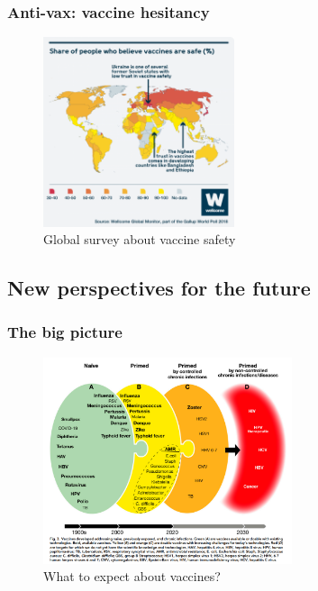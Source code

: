 \begin{frame}
    \frametitle{Anti-vax: vaccine hesitancy}
    \begin{figure}
        \centering
        \includegraphics[width=0.5\textwidth]{imgs/VaccineHesitancy.png}
        \caption{Global survey about vaccine safety \autocite{SurveyRevealsEuropean}}
        \label{fig:responses8}
    \end{figure}
\end{frame}

\subsection{New perspectives for the future}

\begin{frame}
    \frametitle{The big picture}
    \begin{figure}
        \centering
        \includegraphics[width=0.65\textwidth]{imgs/vaccineEvolution.PNG}
        \caption{What to expect about vaccines? \autocite{rappuoliVaccinologyPostCOVID192021}}
        \label{fig:responses13}
    \end{figure}
\end{frame}



